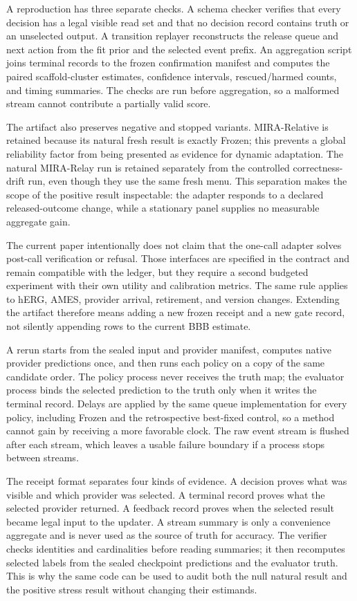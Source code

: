 \documentclass[sigconf,anonymous]{aamas}
\begin{document}
A reproduction has three separate checks. A schema checker verifies that every decision has a legal visible read set and that no decision record contains truth or an unselected output. A transition replayer reconstructs the release queue and next action from the fit prior and the selected event prefix. An aggregation script joins terminal records to the frozen confirmation manifest and computes the paired scaffold-cluster estimates, confidence intervals, rescued/harmed counts, and timing summaries. The checks are run before aggregation, so a malformed stream cannot contribute a partially valid score.

The artifact also preserves negative and stopped variants. MIRA-Relative is retained because its natural fresh result is exactly Frozen; this prevents a global reliability factor from being presented as evidence for dynamic adaptation. The natural MIRA-Relay run is retained separately from the controlled correctness-drift run, even though they use the same fresh menu. This separation makes the scope of the positive result inspectable: the adapter responds to a declared released-outcome change, while a stationary panel supplies no measurable aggregate gain.

The current paper intentionally does not claim that the one-call adapter solves post-call verification or refusal. Those interfaces are specified in the contract and remain compatible with the ledger, but they require a second budgeted experiment with their own utility and calibration metrics. The same rule applies to hERG, AMES, provider arrival, retirement, and version changes. Extending the artifact therefore means adding a new frozen receipt and a new gate record, not silently appending rows to the current BBB estimate.

A rerun starts from the sealed input and provider manifest, computes native provider predictions once, and then runs each policy on a copy of the same candidate order. The policy process never receives the truth map; the evaluator process binds the selected prediction to the truth only when it writes the terminal record. Delays are applied by the same queue implementation for every policy, including Frozen and the retrospective best-fixed control, so a method cannot gain by receiving a more favorable clock. The raw event stream is flushed after each stream, which leaves a usable failure boundary if a process stops between streams.

The receipt format separates four kinds of evidence. A decision proves what was visible and which provider was selected. A terminal record proves what the selected provider returned. A feedback record proves when the selected result became legal input to the updater. A stream summary is only a convenience aggregate and is never used as the source of truth for accuracy. The verifier checks identities and cardinalities before reading summaries; it then recomputes selected labels from the sealed checkpoint predictions and the evaluator truth. This is why the same code can be used to audit both the null natural result and the positive stress result without changing their estimands.
\end{document}
